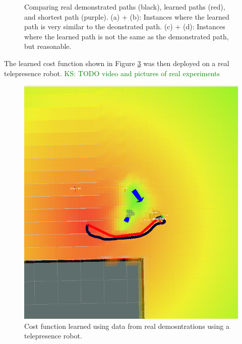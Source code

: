 \documentclass{article}  %
\newcommand{\ks}[1]{\textcolor{green}{KS: #1}}
\begin{document}
\begin{figure}[tbh]
\begin{subfigure}[b]{0.42\columnwidth}
    \caption{}
    \label{fig:res_real4}
  \end{subfigure} 
    \caption{Comparing real demonstrated paths (black), learned paths (red), and shortest path (purple). (a) + (b): Instances where the learned path is very similar to the deonstrated path. (c) + (d): Instances where the learned path is not the same as the demonstrated path, but reasonable.}
    \vspace{-2mm}
  \label{fig:results_real}
  \end{figure}

	The learned cost function shown in Figure \ref{fig:real_cf} was then deployed on a real telepresence robot. \ks{TODO video and pictures of real experiments} 


	\begin{figure}[tbh]
	\centering
    \includegraphics[scale=0.15]{images/cf_real.png}
    \caption{Cost function learned using data from real demosntrations using a telepresence robot.}
    \vspace{-2mm}
  \label{fig:real_cf}
  \end{figure}
\end{document}

